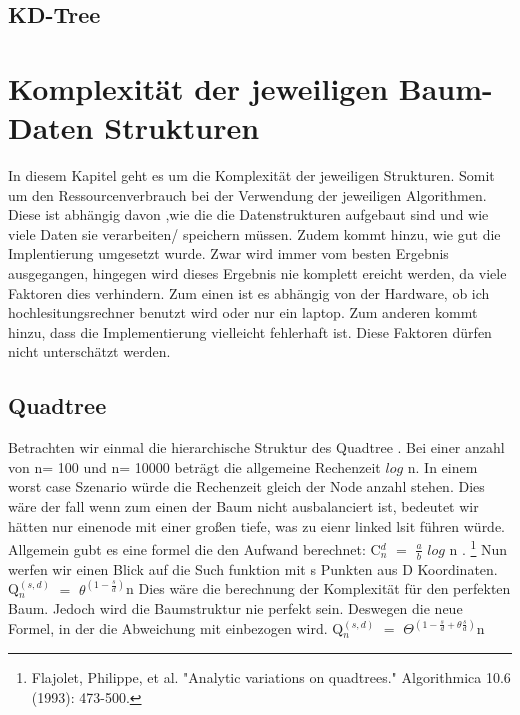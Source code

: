 \documentclass[11pt]{article}
\newcommand{\qt}{Quadtree }
\newcommand{\kd}{KD-Tree }
\begin{document}
\subsection{\kd}





\pagebreak

\section{Komplexität der jeweiligen Baum-Daten Strukturen}
In diesem Kapitel geht es um die Komplexität der jeweiligen Strukturen. Somit um den Ressourcenverbrauch bei der Verwendung der jeweiligen Algorithmen. Diese ist abhängig davon ,wie die die Datenstrukturen aufgebaut sind und wie viele Daten sie verarbeiten/ speichern müssen. 
Zudem kommt hinzu, wie gut die Implentierung umgesetzt wurde. Zwar wird immer vom besten Ergebnis ausgegangen, hingegen wird dieses Ergebnis nie komplett ereicht werden, da viele Faktoren dies verhindern. Zum einen ist es abhängig von der Hardware, ob ich hochlesitungsrechner benutzt wird oder nur ein laptop.
Zum anderen kommt hinzu, dass die Implementierung vielleicht fehlerhaft ist. Diese Faktoren dürfen nicht unterschätzt werden. 


\subsection{\qt}

Betrachten wir einmal die hierarchische Struktur des \qt. Bei einer anzahl von n= 100 und n= 10000 beträgt die allgemeine Rechenzeit $log$ n. In einem worst case Szenario würde die Rechenzeit gleich der Node anzahl stehen. Dies wäre der fall wenn zum einen der Baum nicht ausbalanciert ist, bedeutet wir hätten nur einenode mit einer großen tiefe, was zu eienr linked lsit führen würde.
Allgemein gubt es eine formel die den Aufwand berechnet: C$_n^d$ $=$ $\frac{a}{b}$ $log$ n . \footnote[1]{Flajolet, Philippe, et al. "Analytic variations on quadtrees." Algorithmica 10.6 (1993): 473-500.}
\newline
Nun werfen wir einen Blick auf die Such funktion mit s Punkten aus D Koordinaten. 
Q$_n^{(s,d)}$ $=$ $\theta^{(1- \frac{s}{d})}$n  \newline
Dies wäre die berechnung der Komplexität für den perfekten Baum. Jedoch wird die Baumstruktur nie perfekt sein. 
Deswegen die neue Formel, in der die Abweichung mit einbezogen wird. 
Q$_n^{(s,d)}$ $=$ $\Theta^{(1- \frac{s}{d} + \theta\frac{s}{d})}$n 
\end{document}
